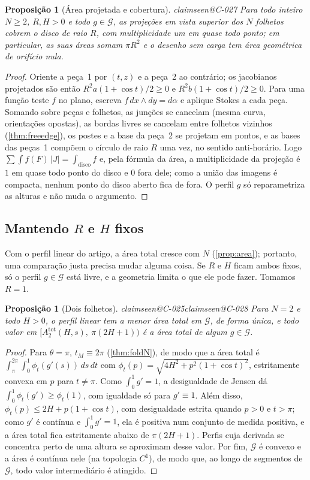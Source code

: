\documentclass[11pt,a4paper]{article}
\makeatletter
\theoremstyle{plain}
\newtheorem{proposition}[theorem]{Proposição}
\theoremstyle{remark}
\newcommand{\claim}[1]{\ifcsname claimseen@#1\endcsname\else\expandafter\gdef\csname claimseen@#1\endcsname{}\label{claim:#1}\fi}
\makeatother
\begin{document}
\begin{proposition}[Área projetada e cobertura]\label{prop:cover}\claim{C-027}
Para todo inteiro $N\ge2$, $R,H>0$ e todo $g\in\mathcal G$, as projeções em vista superior dos $N$ folhetos cobrem o disco de
raio $R$, com multiplicidade um em quase todo ponto; em particular, as suas áreas somam $\pi R^2$ e o desenho sem carga tem
área geométrica de orifício nula.
\end{proposition}
\begin{proof}
Oriente a peça~1 por $(t,z)$ e a peça~2 ao contrário; os jacobianos projetados são então $R^2a(1+\cos t)/2\ge0$ e
$R^2b(1+\cos t)/2\ge0$. Para uma função teste $f$ no plano, escreva $f\,dx\wedge dy=d\alpha$ e aplique Stokes a cada peça.
Somando sobre peças e folhetos, as junções se cancelam (mesma curva, orientações opostas), as bordas livres se cancelam entre
folhetos vizinhos (\cref{thm:freeedge}), os postes e a base da peça~2 se projetam em pontos, e as bases das peças~1 compõem o
círculo de raio $R$ uma vez, no sentido anti-horário. Logo $\sum\int f(F)\,|J|=\int_{\text{disco}}f$ e, pela fórmula da área, a
multiplicidade da projeção é $1$ em quase todo ponto do disco e $0$ fora dele; como a união das imagens é compacta, nenhum
ponto do disco aberto fica de fora. O perfil $g$ só reparametriza as alturas e não muda o argumento.
\end{proof}

\subsection{Mantendo $R$ e $H$ fixos}
Com o perfil linear do artigo, a área total cresce com $N$ (\cref{prop:area}); portanto, uma comparação justa precisa mudar
alguma coisa. Se $R$ e $H$ ficam ambos fixos, só o perfil $g\in\mathcal G$ está livre, e a geometria limita o que ele pode
fazer. Tomamos $R=1$.

\begin{proposition}[Dois folhetos]\label{prop:two}\claim{C-025}\claim{C-028}
Para $N=2$ e todo $H>0$, o perfil linear tem a menor área total em $\mathcal G$, de forma única, e todo valor em
$[A^{\mathrm{tot}}_2(H,s),\ \pi(2H+1))$ é a área total de algum $g\in\mathcal G$.
\end{proposition}
\begin{proof}
Para $\theta=\pi$, $t_M\equiv2\pi$ (\cref{thm:foldN}), de modo que a área total é
$\int_\pi^{2\pi}\!\int_0^1\phi_t(g'(s))\,ds\,dt$ com $\phi_t(p)=\sqrt{4H^2+p^2(1+\cos t)^2}$, estritamente convexa em $p$ para
$t\ne\pi$. Como $\int_0^1g'=1$, a desigualdade de Jensen dá $\int_0^1\phi_t(g')\ge\phi_t(1)$, com igualdade só para $g'\equiv1$.
Além disso, $\phi_t(p)\le2H+p(1+\cos t)$, com desigualdade estrita quando $p>0$ e $t>\pi$; como $g'$ é contínua e
$\int_0^1g'=1$, ela é positiva num conjunto de medida positiva, e a área total fica estritamente abaixo de $\pi(2H+1)$. Perfis
cuja derivada se concentra perto de uma altura se aproximam desse valor. Por fim, $\mathcal G$ é convexo e a área é contínua nele (na topologia $C^1$), de modo que, ao longo de
segmentos de $\mathcal G$, todo valor intermediário é atingido.
\end{proof}
\end{document}
